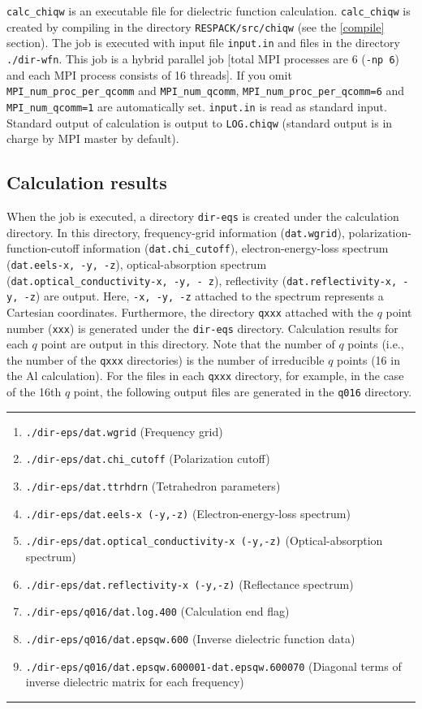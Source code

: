 \documentclass{article}
\begin{document}
\verb+calc_chiqw+ is an executable file for dielectric function calculation. \verb+calc_chiqw+ is created by compiling in the directory \verb+RESPACK/src/chiqw+ (see the \ref{compile} section). The job is executed with input file \verb+input.in+ and files in the directory \verb+./dir-wfn+. This job is a hybrid parallel job [total MPI processes are 6 ({\tt -np 6})  and each MPI process consists of 16 threads]. If you omit {\tt MPI\_num\_proc\_per\_qcomm} and {\tt MPI\_num\_qcomm}, {\tt MPI\_num\_proc\_per\_qcomm=6} and {\tt MPI\_num\_qcomm=1} are automatically set. {\tt input.in} is read as standard input. Standard output of calculation  is output to {\tt LOG.chiqw} (standard output is in charge by MPI master by default). 

\subsection{\label{result-chiqw}Calculation results}
When the job is executed, a directory \verb+dir-eqs+ is created under the calculation directory. In this directory, frequency-grid information ({\tt dat.wgrid}), polarization-function-cutoff information ({\tt dat.chi\_cutoff}), electron-energy-loss spectrum ({\tt dat.eels-x, -y, -z}), optical-absorption spectrum ({\tt dat.optical\_conductivity-x, -y, - z}), reflectivity ({\tt dat.reflectivity-x, -y, -z}) are output. Here, {\tt -x, -y, -z} attached to the spectrum represents a Cartesian coordinates. Furthermore, the directory {\tt qxxx} attached with the $q$ point number ({\tt xxx}) is generated under the {\tt dir-eqs} directory. Calculation results for each $q$ point are output in this directory. Note that the number of $q$ points (i.e., the number of the {\tt qxxx} directories) is the number of irreducible $q$ points (16 in the Al calculation). For the files in each {\tt qxxx} directory, for example, in the case of the 16th $q$ point, the following output files are generated in the {\tt q016} directory.
\vspace{5mm}\hrule
\begin{enumerate}
\item \verb+./dir-eps/dat.wgrid+ (Frequency grid)
\item {\tt ./dir-eps/dat.chi\_cutoff} (Polarization cutoff)
\item {\tt ./dir-eps/dat.ttrhdrn} (Tetrahedron parameters)
\item {\tt ./dir-eps/dat.eels-x (-y,-z)} (Electron-energy-loss spectrum)
\item {\tt ./dir-eps/dat.optical\_conductivity-x (-y,-z)} (Optical-absorption spectrum)
\item {\tt ./dir-eps/dat.reflectivity-x (-y,-z)} (Reflectance spectrum) 
\item \verb+./dir-eps/q016/dat.log.400+ (Calculation end flag)
\item \verb+./dir-eps/q016/dat.epsqw.600+ (Inverse dielectric function data)
\item \verb+./dir-eps/q016/dat.epsqw.600001-dat.epsqw.600070+ (Diagonal terms of inverse dielectric matrix for each frequency)
\end{enumerate}
\hrule\vspace{5mm}
\end{document}
